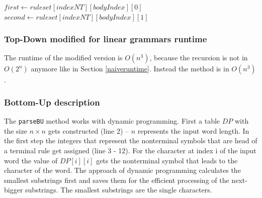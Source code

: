 \documentclass[a4paper, 11pt]{article}
\begin{document}
\begin{algorithm}[H]
\begin{algorithmic}[1]
\State $first \gets ruleset[indexNT][bodyIndex][0]$
\State $second \gets ruleset[indexNT][bodyIndex][1]$
\EndIf
{}
\EndIf
\EndFor
\end{algorithmic}
\end{algorithm}


\subsubsection{Top-Down modified for linear grammars runtime}
\label{lineartopdown_runtime}

The runtime of the modified version is $O(n^3)$, because the recursion is not in $O(2^n)$ anymore like in Section \ref{naiveruntime}. Instead the method is in $O(n^3)$.




\subsubsection{Bottom-Up description}
\label{bottomupdescription}

The \texttt{parseBU} method works with dynamic programming.
First a table $DP$ with the size $n \times n$ gets constructed (line 2) -- $n$ represents the input word length.
In the first step the integers that represent the nonterminal symbols that are head of a terminal rule get assigned (line 3 - 12). For the character at index i of the input word the value of $DP[i][i]$ gets the nonterminal symbol that leads to the character of the word.
The approach of dynamic programming calculates the smallest substrings first and saves them for the efficient processing of the next-bigger substrings.  The smallest substrings are the single characters.
\end{document}

